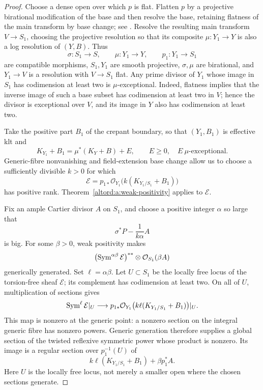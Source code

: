 \begin{proof}
Choose a dense open over which \(p\) is flat. Flatten \(p\) by a
projective birational modification of the base
and then resolve the base, retaining flatness of the main
transform by base change; see \cite[Lemma~38.31.1, Tag~081R]{StacksFlatten}.
Resolve the resulting main transform \(V\to S_1\), choosing the
projective resolution so that its composite \(\mu:Y_1\to Y\) is also
a log resolution of \((Y,B)\). Thus
\[
 \sigma:S_1\to S,\qquad
 \mu:Y_1\to Y,\qquad
 p_1:Y_1\to S_1
\]
are compatible morphisms, \(S_1,Y_1\) are smooth projective,
\(\sigma,\mu\) are birational, and \(Y_1\to V\) is a resolution
with \(V\to S_1\) flat.
Any prime divisor of \(Y_1\) whose image in \(S_1\) has codimension
at least two is \(\mu\)-exceptional.  Indeed, flatness implies that
the inverse image of such a base subset has codimension at least
two in \(V\); hence the divisor is exceptional over \(V\), and
its image in \(Y\) also has codimension at least two.

Take the positive part \(B_1\) of the crepant boundary, so that
\((Y_1,B_1)\) is effective klt and
\begin{equation}\label{altord:a:source-correction}
 K_{Y_1}+B_1=\mu^*(K_Y+B)+E,\qquad
 E\geq0,\quad E\ \text{\(\mu\)-exceptional}.
\end{equation}
Generic-fibre nonvanishing and field-extension base change allow
us to choose a sufficiently divisible \(k>0\) for which
\[
 \mathcal E=
 p_{1*}\mathcal O_{Y_1}\bigl(k(K_{Y_1/S_1}+B_1)\bigr)
\]
has positive rank.  Theorem~\ref{altord:a:weak-positivity} applies to
\(\mathcal E\).

Fix an ample Cartier divisor \(A\) on \(S_1\), and choose a
positive integer \(\alpha\) so large that
\[
 \sigma^*P-\frac{1}{k\alpha}A
\]
is big.  For some \(\beta>0\), weak positivity makes
\[
 \bigl(\operatorname{Sym}^{\alpha\beta}\mathcal E\bigr)^{**}
       \otimes\mathcal O_{S_1}(\beta A)
\]
generically generated.  Set \(\ell=\alpha\beta\).
Let \(U\subset S_1\) be the locally free locus of the torsion-free
sheaf \(\mathcal E\); its complement has codimension at least two.
On all of \(U\), multiplication of sections gives
\[
 \operatorname{Sym}^\ell\mathcal E|_U\longrightarrow
 p_{1*}\mathcal O_{Y_1}
       \bigl(k\ell(K_{Y_1/S_1}+B_1)\bigr)|_U.
\]
This map is nonzero at the generic point: a nonzero section on the
integral generic fibre has nonzero powers.  Generic generation
therefore supplies a global section of the twisted reflexive
symmetric power whose product is nonzero.  Its image is a regular
section over \(p_1^{-1}(U)\) of
\[
 k\ell(K_{Y_1/S_1}+B_1)+\beta p_1^*A.
\]
Here \(U\) is the locally free locus, not merely a smaller open
where the chosen sections generate.


\end{proof}
